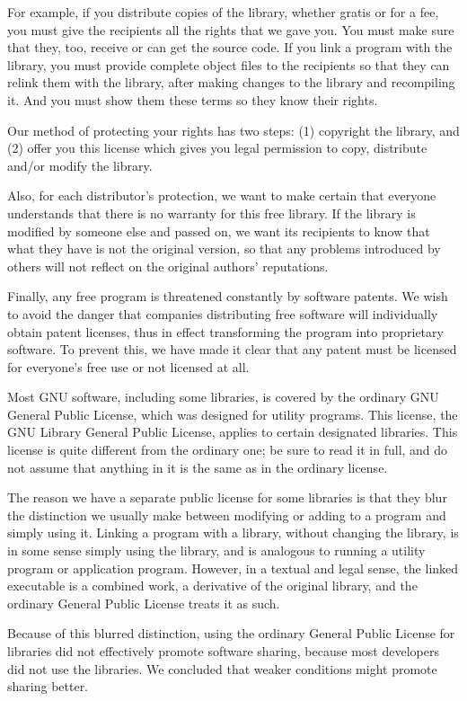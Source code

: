 \documentclass[a4paper,twoside]{tceusermanual}
\begin{document}
For example, if you distribute copies of the library, whether
gratis or for a fee, you must give the recipients all the rights
that we gave you.  You must make sure that they, too, receive or
can get the source code.  If you link a program with the
library, you must provide complete object files to the
recipients so that they can relink them with the library, after
making changes to the library and recompiling it.  And you must
show them these terms so they know their rights.

Our method of protecting your rights has two steps: (1)
copyright the library, and (2) offer you this license which
gives you legal permission to copy, distribute and/or modify the
library.

Also, for each distributor's protection, we want to make certain
that everyone understands that there is no warranty for this
free library.  If the library is modified by someone else and
passed on, we want its recipients to know that what they have is
not the original version, so that any problems introduced by
others will not reflect on the original authors' reputations.
 
Finally, any free program is threatened constantly by software
patents.  We wish to avoid the danger that companies
distributing free software will individually obtain patent
licenses, thus in effect transforming the program into
proprietary software.  To prevent this, we have made it clear
that any patent must be licensed for everyone's free use or not
licensed at all.

Most GNU software, including some libraries, is covered by the
ordinary GNU General Public License, which was designed for
utility programs.  This license, the GNU Library General Public
License, applies to certain designated libraries.  This license
is quite different from the ordinary one; be sure to read it in
full, and do not assume that anything in it is the same as in the
ordinary license.

The reason we have a separate public license for some libraries
is that they blur the distinction we usually make between
modifying or adding to a program and simply using it.  Linking a
program with a library, without changing the library, is in some
sense simply using the library, and is analogous to running a
utility program or application program.  However, in a textual
and legal sense, the linked executable is a combined work, a
derivative of the original library, and the ordinary General
Public License treats it as such.

Because of this blurred distinction, using the ordinary General
Public License for libraries did not effectively promote
software sharing, because most developers did not use the
libraries.  We concluded that weaker conditions might promote
sharing better.
\end{document}
